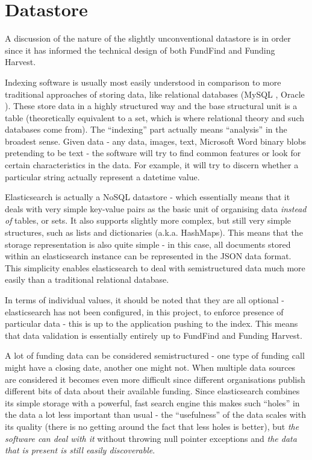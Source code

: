 \section{Datastore}
\label{design-datastore}
A discussion of the nature of the slightly unconventional datastore is in order since it has informed the technical design of both FundFind and Funding Harvest.

 Indexing software is usually most easily understood in comparison to more traditional approaches of storing data, like relational databases (MySQL \cite{mysql}, Oracle \cite{oracle}). These store data in a highly structured way and the base structural unit is a table (theoretically equivalent to a set, which is where relational theory and such databases come from). The ``indexing'' part actually means ``analysis'' in the broadest sense. Given data - any data, images, text, Microsoft Word binary blobs pretending to be text - the software will try to find common features or look for certain characteristics in the data. For example, it will try to discern whether a particular string actually represent a datetime value.
 
 Elasticsearch is actually a NoSQL datastore - which essentially means that it deals with very simple key-value pairs as the basic unit of organising data \emph{instead of} tables, or sets. It also supports slightly more complex, but still very simple structures, such as lists and dictionaries (a.k.a. HashMaps). This means that the storage representation is also quite simple - in this case, all documents stored within an elasticsearch instance can be represented in the JSON data format. This simplicity enables elasticsearch to deal with semistructured data much more easily than a traditional relational database.
 
 In terms of individual values, it should be noted that they are all optional - elasticsearch has not been configured, in this project, to enforce presence of particular data - this is up to the application pushing to the index. This means that data validation is essentially entirely up to FundFind and Funding Harvest.
 
 A lot of funding data can be considered semistructured - one type of funding call might have a closing date, another one might not. When multiple data sources are considered it becomes even more difficult since different organisations publish different bits of data about their available funding. Since elasticsearch combines its simple storage with a powerful, fast search engine this makes such ``holes'' in the data a lot less important than usual - the ``usefulness'' of the data scales with its quality (there is no getting around the fact that less holes is better), but \emph{the software can deal with it} without throwing null pointer exceptions and \emph{the data that is present is still easily discoverable}.
 
